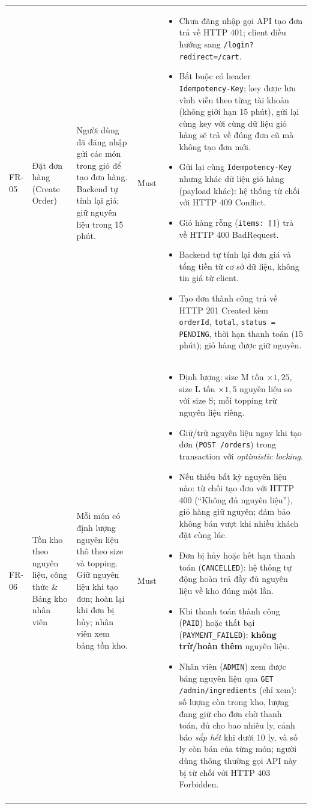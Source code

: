 \begin{longtable}{@{}p{1.2cm}p{2.6cm}p{4.2cm}p{1.4cm}p{6.6cm}@{}}
FR-05 & Đặt đơn hàng (Create Order)
  & Người dùng đã đăng nhập gửi các món trong giỏ để tạo đơn hàng. Backend tự tính lại giá; giữ nguyên liệu trong 15 phút.
  & Must
  & \begin{itemize}[leftmargin=*]
      \item Chưa đăng nhập gọi API tạo đơn trả về HTTP 401; client điều hướng sang \texttt{/login?redirect=/cart}.
      \item Bắt buộc có header \texttt{Idempotency-Key}; key được lưu vĩnh viễn theo từng tài khoản (không giới hạn 15 phút), gửi lại cùng key với cùng dữ liệu giỏ hàng sẽ trả về đúng đơn cũ mà không tạo đơn mới.
      \item Gửi lại cùng \texttt{Idempotency-Key} nhưng khác dữ liệu giỏ hàng (payload khác): hệ thống từ chối với HTTP 409 Conflict.
      \item Giỏ hàng rỗng (\texttt{items: []}) trả về HTTP 400 BadRequest.
      \item Backend tự tính lại đơn giá và tổng tiền từ cơ sở dữ liệu, không tin giá từ client.
      \item Tạo đơn thành công trả về HTTP 201 Created kèm \texttt{orderId}, \texttt{total}, \texttt{status = PENDING}, thời hạn thanh toán (15 phút); giỏ hàng được giữ nguyên.
    \end{itemize} \\
\addlinespace

FR-06 & Tồn kho theo nguyên liệu, công thức \& Bảng kho nhân viên
  & Mỗi món có định lượng nguyên liệu thô theo size và topping. Giữ nguyên liệu khi tạo đơn; hoàn lại khi đơn bị hủy; nhân viên xem bảng tồn kho.
  & Must
  & \begin{itemize}[leftmargin=*]
      \item Định lượng: size M tốn $\times 1{,}25$, size L tốn $\times 1{,}5$ nguyên liệu so với size S; mỗi topping trừ nguyên liệu riêng.
      \item Giữ/trừ nguyên liệu ngay khi tạo đơn (\texttt{POST /orders}) trong transaction với \emph{optimistic locking}.
      \item Nếu thiếu bất kỳ nguyên liệu nào: từ chối tạo đơn với HTTP 400 (``Không đủ nguyên liệu''), giỏ hàng giữ nguyên; đảm bảo không bán vượt khi nhiều khách đặt cùng lúc.
      \item Đơn bị hủy hoặc hết hạn thanh toán (\texttt{CANCELLED}): hệ thống tự động hoàn trả đầy đủ nguyên liệu về kho đúng một lần.
      \item Khi thanh toán thành công (\texttt{PAID}) hoặc thất bại (\texttt{PAYMENT\_FAILED}): \textbf{không trừ/hoàn thêm} nguyên liệu.
      \item Nhân viên (\texttt{ADMIN}) xem được bảng nguyên liệu qua \texttt{GET /admin/ingredients} (chỉ xem): số lượng còn trong kho, lượng đang giữ cho đơn chờ thanh toán, đủ cho bao nhiêu ly, cảnh báo \emph{sắp hết} khi dưới 10 ly, và số ly còn bán của từng món; người dùng thông thường gọi API này bị từ chối với HTTP 403 Forbidden.
    \end{itemize} \\
\addlinespace


\end{longtable}
